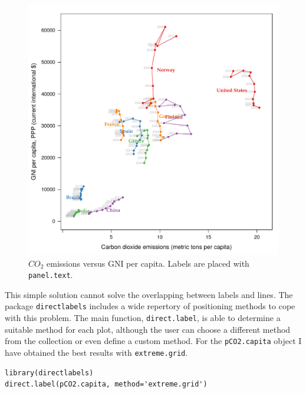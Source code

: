 \begin{figure}[htb]
\centering
\includegraphics[width=.9\linewidth]{figs/CO2_capita.pdf}
\caption{\label{fig:CO2_GNI_glayer}$CO_2$ emissions versus GNI per capita. Labels are placed with \texttt{panel.text}.}
\end{figure}

This simple solution cannot solve the overlapping between labels
and lines. The package \texttt{directlabels} includes a wide repertory of
positioning methods to cope with this problem. The main function,
\texttt{direct.label}, is able to determine a suitable method for each
plot, although the user can choose a different method from the
collection or even define a custom method. For the \texttt{pCO2.capita}
object I have obtained the best results with \texttt{extreme.grid}.


\lstset{language=R}
\begin{lstlisting}
library(directlabels)
direct.label(pCO2.capita, method='extreme.grid')
\end{lstlisting}

